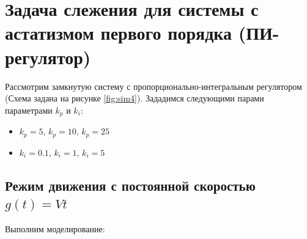 \chapter{Задача слежения для системы с астатизмом первого порядка
(ПИ-регулятор)}
Рассмотрим замкнутую систему с пропорционально-интегральным регулятором (Схема задана на рисунке
\hyperref[fig:sim4]{\ref{fig:sim4}}). Зададимся следующими парами параметрами $k_p$ и $k_i$:
\begin{itemize}
    \item $k_p = 5$, $k_p = 10$, $k_p = 25$
    \item $k_i = 0.1$, $k_i = 1$, $k_i = 5$
\end{itemize}
\section{Режим движения с постоянной скоростью $g(t) = Vt$}
Выполним моделирование:
